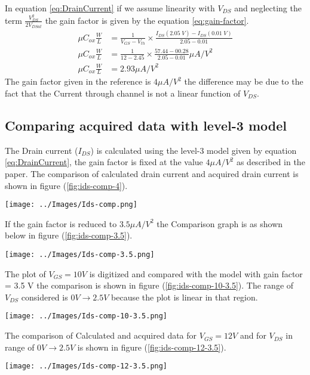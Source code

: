 \documentclass{article}
\begin{document}
In equation \ref{eq:DrainCurrent} if we assume linearity with $V_{DS}$ and neglecting the term $\frac{V_{DS}^2}{2V_{DSat}}$ the gain factor is given by the equation \ref{eq:gain-factor}. 
\begin{align}
    \label{eq:gain-factor}
    \mu C_{ox} \frac{W}{L} &= \frac{1}{V_{GS}-V_{th}}\times\frac{I_{DS}(2.05 \; V) - I_{DS}(0.01 \; V)}{2.05-0.01} \\
    \mu C_{ox} \frac{W}{L} &= \frac{1}{12-2.45}\times\frac{57.44 - 00.28}{2.05-0.01} \mu A/V^2 \\ 
    \mu C_{ox} \frac{W}{L} &= 2.93 \mu A/V^2
\end{align}
The gain factor given in the reference is $4 \mu A/V^2$ the difference may be due to the fact that the Current through channel is not a linear function of $V_{DS}$. 
\newpage
\subsection{Comparing acquired data with level-3 model}
The Drain current ($I_{DS}$) is calculated using the level-3 model given by equation \ref{eq:DrainCurrent}, the gain factor is fixed at the value $4 \mu A/V^2$ as described in the paper. The comparison of calculated drain current and acquired drain current is shown in figure (\ref{fig:ids-comp-4}).
\begin{center}
    \label{fig:ids-comp-4}
    \texttt{[image: ../Images/Ids-comp.png]}    
\end{center}


If the gain factor is reduced to $3.5 \mu A / V^2$ the Comparison graph is as shown below in figure (\ref{fig:ids-comp-3.5}). 
\begin{center}
    \label{fig:ids-comp-3.5}
    \texttt{[image: ../Images/Ids-comp-3.5.png]}

\end{center}
The plot of $V_{GS} = 10 V$ is digitized and compared with the model with gain factor = 3.5 V the comparison is shown in figure (\ref{fig:ids-comp-10-3.5}). The range of $V_{DS}$ considered is $0 V \to 2.5 V$ because the plot is linear in that region. 

\begin{center}
    \label{fig:ids-comp-10-3.5}
    \texttt{[image: ../Images/Ids-comp-10-3.5.png]}
\end{center}
The comparison of Calculated and acquired data for $V_{GS} = 12 V$ and for  $V_{DS}$  in range of $0 V\to 2.5 V $ is shown in figure (\ref{fig:ids-comp-12-3.5}). 
\begin{center}
    \label{fig:ids-comp-12-3.5}
    \texttt{[image: ../Images/Ids-comp-12-3.5.png]}
\end{center}
\end{document}
